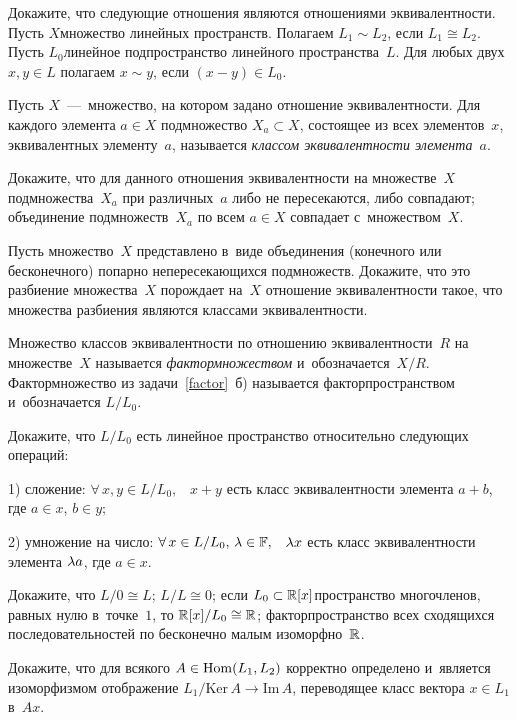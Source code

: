\documentclass[a4paper,12pt,fleqn]{article}
\renewcommand{\ker}{\mathrm{Ker\,}}
\newcommand{\im}{\mathrm{Im\,}}
\begin{document}
 \label{factor}
Докажите, что следующие отношения являются отношениями эквивалентности.
 Пусть $X$\т множество линейных пространств. Полагаем $L_1\sim L_2$, если $L_1\cong L_2$.
 Пусть $L_0$\т линейное подпространство линейного пространства~$L$. Для любых двух $x,y\in L$ полагаем $x\sim y$, если $(x-y)\in L_0$.

Пусть $X$~---~множество, на котором задано отношение эквивалентности. Для каждого элемента $a\in X$ подмножество $X_{a}\subset X$, состоящее из всех элементов~$x$, эквивалентных элементу~$a$, называется {\it классом эквивалентности элемента}~$a$.

Докажите, что для данного отношения эквивалентности на множестве~$X$
 подмножества~$X_{a}$ при различных~$a$ либо не пересекаются, либо совпадают;
 объединение подмножеств~$X_{a}$ по всем $a\in X$ совпадает с~множеством~$X$.

Пусть множество~$X$ представлено в~виде объединения (конечного или бесконечного) попарно непересекающихся подмножеств. Докажите, что это разбиение множества~$X$ порождает на~$X$ отношение эквивалентности такое, что множества разбиения являются классами эквивалентности.

Множество классов эквивалентности по отношению эквивалентности~$R$ на множестве~$X$ называется {\it фактормножеством} и~обозначается~$X/R$. Фактормножество из задачи~\ref{factor}~б) называется факторпространством и~обозначается $L/L_0$.

Докажите, что $L/L_0$ есть линейное пространство относительно следующих операций:
\begin{items}{-3}
\item[1)]
сложение: $\forall\,x,y\in L/L_0,\,\,\,$ $x+y$ есть класс эквивалентности элемента $a+b$, где $a\in x$, $b\in y$;
\item[2)]
умножение на число: $\forall\,x\in L/L_0,\,\lambda\in\mathbb{F},\,\,\,$ $\lambda x$ есть класс эквивалентности элемента $\lambda a$, где $a\in x$.
\end{items}

\vspace{-3mm}
Докажите, что
 $L/0\cong L$;
 $L/L\cong 0$;
 если $L_0\subset\mathbb{R}[x]$\т пространство многочленов, равных нулю в~точке~$1$, то $\mathbb{R}[x]/L_0\cong \mathbb{R}$;
 факторпространство всех сходящихся последовательностей по бесконечно
малым изоморфно~$\mathbb{R}$.

Докажите, что для всякого $A\in\operatorname{Hom}(L_1,L_2)$ корректно определено и~является изоморфизмом отображение  $L_1/\ker A\to\im A$, переводящее класс вектора $x\in L_1$ в~$Ax$.

{}
\end{document}
